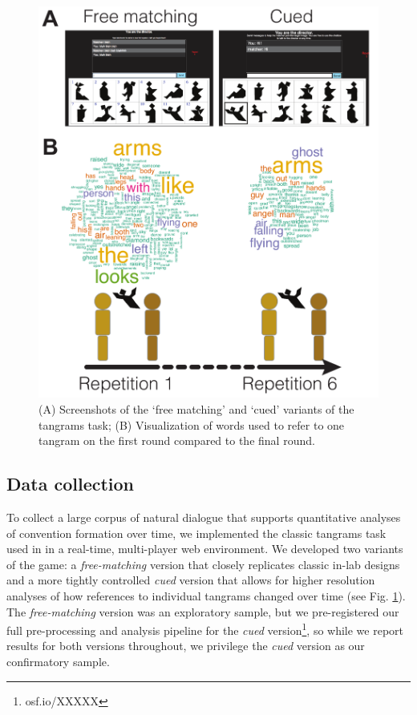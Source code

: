 \documentclass[alpha-refs]{wiley-article}
\begin{document}
\begin{figure}
\includegraphics[scale=.65]{designAndExample.pdf}
\caption{(A) Screenshots of the `free matching' and `cued' variants of the tangrams task; (B) Visualization of words used to refer to one tangram on the first round compared to the final round. }
\label{fig:design}
\end{figure}

\subsection{Data collection}

To collect a large corpus of natural dialogue that supports quantitative analyses of convention formation over time, we implemented the classic tangrams task used in \cite{clarkReferringCollaborativeProcess1986} in a real-time, multi-player web environment. 
We developed two variants of the game: a \emph{free-matching} version that closely replicates classic in-lab designs and a more tightly controlled \emph{cued} version that allows for higher resolution analyses of how references to individual tangrams changed over time (see Fig. \ref{fig:design}). 
The \emph{free-matching} version was an exploratory sample, but we pre-registered our full pre-processing and analysis pipeline for the \emph{cued} version\footnote{osf.io/XXXXX}, so while we report results for both versions throughout, we privilege the \emph{cued} version as our confirmatory sample.
\end{document}
